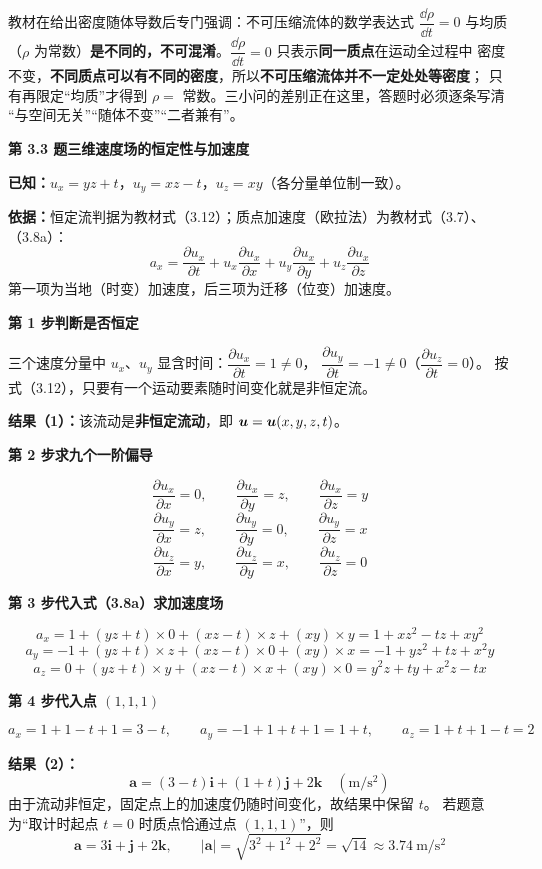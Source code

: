 \begin{yicuo}
教材在给出密度随体导数后专门强调：不可压缩流体的数学表达式 $\dfrac{\dd\rho}{\dd t}=0$ 与均质
（$\rho$ 为常数）\textbf{是不同的，不可混淆}。$\dfrac{\dd\rho}{\dd t}=0$ 只表示\textbf{同一质点}在运动全过程中
密度不变，\textbf{不同质点可以有不同的密度}，所以\textbf{不可压缩流体并不一定处处等密度}；
只有再限定“均质”才得到 $\rho=$ 常数。三小问的差别正在这里，答题时必须逐条写清
“与空间无关”“随体不变”“二者兼有”。
\end{yicuo}

\noindent\textbf{第 3.3 题\quad 三维速度场的恒定性与加速度}

\begin{jie}
\textbf{已知：}$u_x=yz+t$，$u_y=xz-t$，$u_z=xy$（各分量单位制一致）。

\textbf{依据：}恒定流判据为教材式（3.12）；质点加速度（欧拉法）为教材式（3.7）、（3.8a）：
\[ a_x=\frac{\partial u_x}{\partial t}+u_x\frac{\partial u_x}{\partial x}
   +u_y\frac{\partial u_x}{\partial y}+u_z\frac{\partial u_x}{\partial z} \]
第一项为当地（时变）加速度，后三项为迁移（位变）加速度。

\textbf{第 1 步\quad 判断是否恒定}

三个速度分量中 $u_x$、$u_y$ 显含时间：$\dfrac{\partial u_x}{\partial t}=1\neq0$，
$\dfrac{\partial u_y}{\partial t}=-1\neq0$（$\dfrac{\partial u_z}{\partial t}=0$）。
按式（3.12），只要有一个运动要素随时间变化就是非恒定流。

\textbf{结果（1）：}该流动是\textbf{非恒定流动}，即 $\bm{u}=\bm{u}(x,y,z,t)$。

\textbf{第 2 步\quad 求九个一阶偏导}

\[ \frac{\partial u_x}{\partial x}=0,\qquad \frac{\partial u_x}{\partial y}=z,\qquad \frac{\partial u_x}{\partial z}=y \]
\[ \frac{\partial u_y}{\partial x}=z,\qquad \frac{\partial u_y}{\partial y}=0,\qquad \frac{\partial u_y}{\partial z}=x \]
\[ \frac{\partial u_z}{\partial x}=y,\qquad \frac{\partial u_z}{\partial y}=x,\qquad \frac{\partial u_z}{\partial z}=0 \]

\textbf{第 3 步\quad 代入式（3.8a）求加速度场}

\[ a_x=1+(yz+t)\times0+(xz-t)\times z+(xy)\times y=1+xz^2-tz+xy^2 \]
\[ a_y=-1+(yz+t)\times z+(xz-t)\times0+(xy)\times x=-1+yz^2+tz+x^2y \]
\[ a_z=0+(yz+t)\times y+(xz-t)\times x+(xy)\times0=y^2z+ty+x^2z-tx \]

\textbf{第 4 步\quad 代入点 $(1,1,1)$}

\[ a_x=1+1-t+1=3-t,\qquad a_y=-1+1+t+1=1+t,\qquad a_z=1+t+1-t=2 \]

\textbf{结果（2）：}
\[ \bm a=(3-t)\bm{i}+(1+t)\bm{j}+2\bm{k}\quad(\mathrm{m/s^2}) \]
由于流动非恒定，固定点上的加速度仍随时间变化，故结果中保留 $t$。
若题意为“取计时起点 $t=0$ 时质点恰通过点 $(1,1,1)$”，则
\[ \bm a=3\bm{i}+\bm{j}+2\bm{k},\qquad
   |\bm a|=\sqrt{3^2+1^2+2^2}=\sqrt{14}\approx3.74\ \mathrm{m/s^2} \]
\end{jie}

